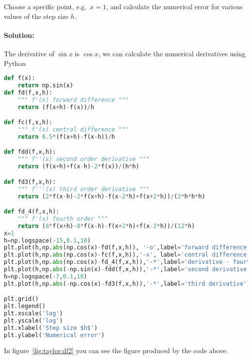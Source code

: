 \documentclass[graybox,sectrefs,envcountresetchap,open=right,final]{svmonodo}
\newenvironment{graybox2admon}[1][]{
\begin{graybox2mdframed}[frametitle=#1]
}
{
\end{graybox2mdframed}
}
\begin{document}
\begin{graybox2admon}[Example: calculate the numerical derivative and second derivative of $\sin x$]
Choose a specific point, e.g.~$x=1$, and calculate the numerical error for various values of the step size $h$.
\paragraph{Solution:}
The derivative of $\sin x$ is $\cos x$, we can calculate the numerical derivatives using Python






































\begin{lstlisting}[language=python,style=blue1]
def f(x):
    return np.sin(x)
def fd(f,x,h):
    """ f'(x) forward difference """
    return (f(x+h)-f(x))/h

def fc(f,x,h):
    """ f'(x) central difference """
    return 0.5*(f(x+h)-f(x-h))/h

def fdd(f,x,h):
    """ f''(x) second order derivative """
    return (f(x+h)+f(x-h)-2*f(x))/(h*h)

def fd3(f,x,h):
    """ f'''(x) third order derivative """
    return (2*f(x-h)-2*f(x+h)-f(x-2*h)+f(x+2*h))/(2*h*h*h)

def fd_4(f,x,h):
    """ f'(x) fourth order """
    return (8*f(x+h)-8*f(x-h)-f(x+2*h)+f(x-2*h))/(12*h)
x=1
h=np.logspace(-15,0.1,10)
plt.plot(h,np.abs(np.cos(x)-fd(f,x,h)), '-o',label='forward difference')
plt.plot(h,np.abs(np.cos(x)-fc(f,x,h)),'-x', label='central difference')
plt.plot(h,np.abs(np.cos(x)-fd_4(f,x,h)),'-*',label='derivative - fourth order')
plt.plot(h,np.abs(-np.sin(x)-fdd(f,x,h)),'-*',label='second derivative')
h=np.logspace(-7,0.1,10)
plt.plot(h,np.abs(-np.cos(x)-fd3(f,x,h)),'-*',label='third derivative')

plt.grid()
plt.legend()
plt.xscale('log')
plt.yscale('log')
plt.xlabel('Step size $h$')
plt.ylabel('Numerical error')

\end{lstlisting}


In figure~\ref{fig:taylor:df2} you can see the figure produced by the code above.
\end{graybox2admon}
\end{document}
